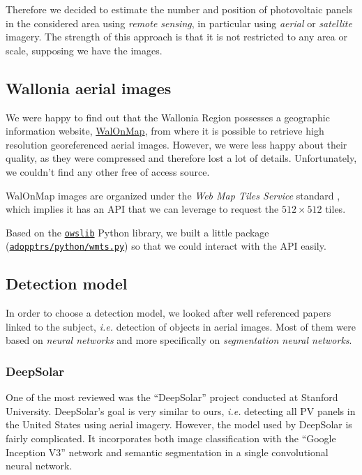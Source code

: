 \documentclass[a4paper, 12pt]{article}
\begin{document}
Therefore we decided to estimate the number and position of photovoltaic panels in the considered area using \emph{remote sensing}, in particular using \emph{aerial} or \emph{satellite} imagery. The strength of this approach is that it is not restricted to any area or scale, supposing we have the images.

\subsection{Wallonia aerial images}

We were happy to find out that the Wallonia Region possesses a geographic information website, \href{http://geoportail.wallonie.be/walonmap}{WalOnMap}, from where it is possible to retrieve high resolution georeferenced aerial images. However, we were less happy about their quality, as they were compressed and therefore lost a lot of details. Unfortunately, we couldn't find any other free of access source.

WalOnMap images are organized under the \emph{Web Map Tiles Service} standard \parencite{maso2010opengis}, which implies it has an API that we can leverage to request the $512 \times 512$ tiles.

Based on the \href{https://github.com/geopython/OWSLib}{\texttt{owslib}} Python library, we built a little package (\href{https://github.com/francois-rozet/adopptrs/blob/master/python/wmts.py}{\texttt{adopptrs/python/wmts.py}}) so that we could interact with the API easily.

\subsection{Detection model}

In order to choose a detection model, we looked after well referenced papers linked to the subject, \emph{i.e.} detection of objects in aerial images. Most of them were based on \emph{neural networks} and more specifically on \emph{segmentation neural networks}. 

\subsubsection{DeepSolar}

One of the most reviewed was the \enquote{DeepSolar} \parencite{yu2018deepsolar} project conducted at Stanford University. DeepSolar's goal is very similar to ours, \emph{i.e.} detecting all PV panels in the United States using aerial imagery. However, the model used by DeepSolar is fairly complicated. It incorporates both image classification with the \enquote{Google Inception V3} network \parencite{szegedy2016rethinking} and semantic segmentation in a single convolutional neural network.
\end{document}
